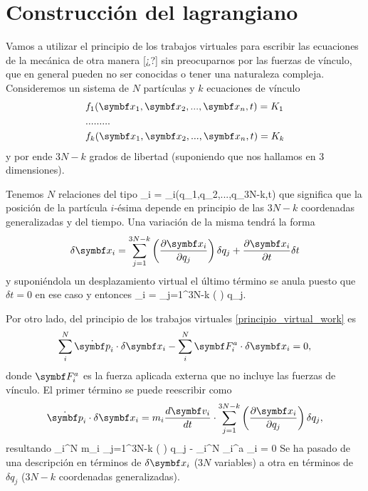 \documentclass[10pt,oneside]{CBFT_book}
\begin{document}
\section{Construcción del lagrangiano}

Vamos a utilizar el principio de los trabajos virtuales para escribir las ecuaciones de la mecánica
de otra manera [¿?] sin preocuparnos por las fuerzas de vínculo, que en general pueden no ser 
conocidas o tener una naturaleza compleja.
Consideremos un sistema de $N$ partículas y $k$ ecuaciones de vínculo 
\begin{eqnarray*}
	& f_1(\vb{x}_1, \vb{x}_2,...,\vb{x}_n,t) = K_1  \\ 
	& ... ... ... \\
	& f_k(\vb{x}_1, \vb{x}_2,...,\vb{x}_n,t) = K_k 
\end{eqnarray*}
y por ende $3N-k$ grados de libertad (suponiendo que nos hallamos en 3 dimensiones).

Tenemos $N$ relaciones del tipo 
\be
	_i = _i(q_1,q_2,...,q_{3N-k},t)
	\label{x_part}
\ee
que significa que la posición de la partícula $i$-ésima depende en principio de las $3N-k$ coordenadas
generalizadas y del tiempo. Una variación de la misma tendrá la forma
\[
	\delta \vb{x}_i =  \sum_{j=1}^{3N-k} \left( \dpar{\vb{x}_i}{q_j} \right) \delta q_j + 
	\dpar{\vb{x}_i}{t}\delta t
\]
y suponiéndola un desplazamiento virtual el último término se anula puesto que $\delta t=0$ en ese
caso y entonces
\be
	\delta {}_i =  \sum_{j=1}^{3N-k} \left(  \right) \delta q_j.
	\label{delta_x_to_delta_q}
\ee

Por otro lado, del principio de los trabajos virtuales \eqref{principio_virtual_work} es
\[
	\sum_i^N \dot{\vb{p}}_i \cdot \delta \vb{x}_i - \sum_i^N  \vb{F}_i^a \cdot \delta \vb{x}_i = 0,
\]
donde $\vb{F}_i^a$ es la fuerza aplicada externa que no incluye las fuerzas de vínculo. El primer término 
se puede reescribir como
\[
	\dot{\vb{p}}_i \cdot \delta \vb{x}_i = m_i \dtot{\vb{v}_i}{t} \cdot \sum_{j=1}^{3N-k} 
	\left( \dpar{\vb{x}_i}{q_j} \right) \delta q_j,
\]
resultando
\be
	\sum_i^N m_i  \cdot \sum_{j=1}^{3N-k} \left(  \right)
	\delta q_j - \sum_i^N  _i^a \cdot \delta {}_i = 0
	\label{virtual_work_2}
\ee
Se ha pasado de una descripción en términos de $\delta \vb{x}_i$ ($3N$ variables) a otra en términos de $\delta q_j$
($3N-k$ coordenadas generalizadas).
\end{document}

